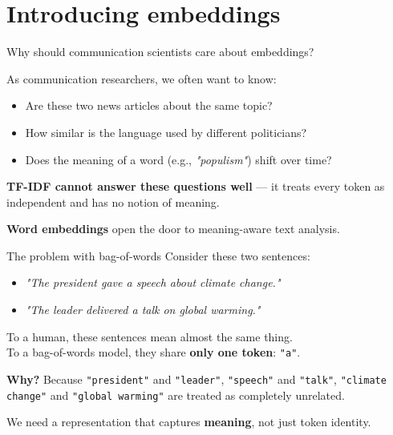 \documentclass[handout]{beamer}
\begin{document}
\section{Introducing embeddings}

\begin{frame}{Why should communication scientists care about embeddings?}

    As communication researchers, we often want to know:
    \begin{itemize}
        \item Are these two news articles about the same topic?
        \item How similar is the language used by different politicians?
        \item Does the meaning of a word (e.g., \emph{"populism"}) shift over time?
    \end{itemize}

    \vspace{0.5em}
    \textbf{TF-IDF cannot answer these questions well} --- it treats every token as independent and has no notion of meaning.

    \vspace{0.5em}
    \textbf{Word embeddings} open the door to meaning-aware text analysis.
\end{frame}

\begin{frame}{The problem with bag-of-words}
    Consider these two sentences:
    \begin{itemize}
        \item \emph{"The president gave a speech about climate change."}
        \item \emph{"The leader delivered a talk on global warming."}
    \end{itemize}

    \vspace{0.5em}
    \pause
    To a human, these sentences mean almost the same thing.\\
    To a bag-of-words model, they share \textbf{only one token}: \texttt{"a"}.

    \vspace{0.5em}
    \pause
    \textbf{Why?} Because \texttt{"president"} and \texttt{"leader"}, \texttt{"speech"} and \texttt{"talk"}, \texttt{"climate change"} and \texttt{"global warming"} are treated as completely unrelated.

    \vspace{0.5em}
    We need a representation that captures \textbf{meaning}, not just token identity.
\end{frame}
\end{document}
